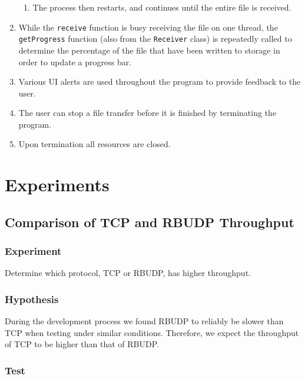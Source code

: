 \documentclass[10pt, a4paper]{article}
\begin{document}
\begin{enumerate}
\begin{enumerate}
      \item The process then restarts, and continues until the entire file is
        received.
    \end{enumerate}
  \item While the \texttt{receive} function is busy receiving the file on one
    thread, the \texttt{getProgress} function (also from the \texttt{Receiver}
    class) is repeatedly called to determine the percentage of the file that
    have been written to storage in order to update a progress bar.
  \item Various UI alerts are used throughout the program to provide feedback to
    the user.
  \item The user can stop a file transfer before it is finished by terminating
    the program.
  \item Upon termination all resources are closed.
\end{enumerate}


\section{Experiments}
\label{sec:exp}

\subsection{Comparison of TCP and RBUDP Throughput}
\label{subsec:comp-tcp-rbudp-throughput}

\subsubsection{Experiment}
\label{subsubsec:exp-1}

Determine which protocol, TCP or RBUDP, has higher throughput.

\subsubsection{Hypothesis}
\label{subsubsec:exp-1}

During the development process we found RBUDP to reliably be slower than TCP
when testing under similar conditions. Therefore, we expect the throughput of
TCP to be higher than that of RBUDP.

\subsubsection{Test}
\label{subsubsec:test-1}
\end{document}
